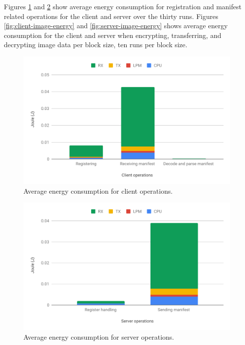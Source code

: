 \documentclass[0-thesis.tex]{subfiles}
\begin{document}
Figures \ref{fig:client-operations-energy} and \ref{fig:server-operations-energy} show
average energy consumption for registration and manifest related operations for the
client and server over the thirty runs. Figures \ref{fig:client-image-energy} and
\ref{fig:server-image-energy} shows average energy consumption for the client and server
when encrypting, transferring, and decrypting image data per block size, ten runs per
block size. 

\begin{figure}[]
    \caption{Average energy consumption for client operations.}
    \label{fig:client-operations-energy}
    \includegraphics[scale=0.65]{images/client-operations-energy.pdf}
\end{figure}

\begin{figure}[]
    \caption{Average energy consumption for server operations.}
    \label{fig:server-operations-energy}
    \includegraphics[scale=0.65]{images/server-operations-energy.pdf}
\end{figure}
\end{document}
